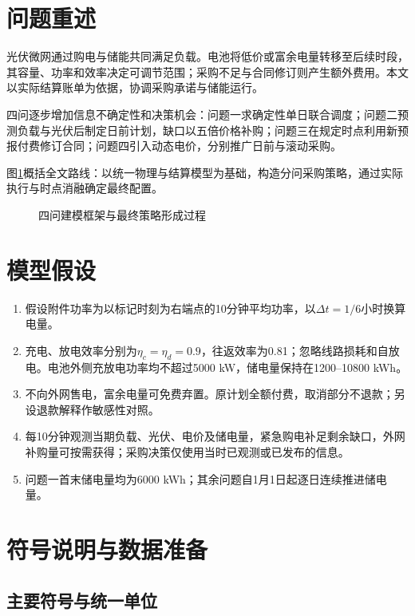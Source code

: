 \section{问题重述}

光伏微网通过购电与储能共同满足负载。电池将低价或富余电量转移至后续时段，其容量、功率和效率决定可调节范围；采购不足与合同修订则产生额外费用。本文以实际结算账单为依据，协调采购承诺与储能运行。

四问逐步增加信息不确定性和决策机会：问题一求确定性单日联合调度；问题二预测负载与光伏后制定日前计划，缺口以五倍价格补购；问题三在规定时点利用新预报付费修订合同；问题四引入动态电价，分别推广日前与滚动采购。

图\ref{fig:modeling-framework}概括全文路线：以统一物理与结算模型为基础，构造分问采购策略，通过实际执行与时点消融确定最终配置。

\begin{figure}[H]\centering

\caption{四问建模框架与最终策略形成过程}
\label{fig:modeling-framework}
\end{figure}

\section{模型假设}

\begin{enumerate}
 \item 假设附件功率为以标记时刻为右端点的10分钟平均功率，以$\Delta t=1/6$小时换算电量。
 \item 充电、放电效率分别为$\eta_c=\eta_d=0.9$，往返效率为0.81；忽略线路损耗和自放电。电池外侧充放电功率均不超过5000 kW，储电量保持在1200--10800 kWh。
 \item 不向外网售电，富余电量可免费弃置。原计划全额付费，取消部分不退款；另设退款解释作敏感性对照。
 \item 每10分钟观测当期负载、光伏、电价及储电量，紧急购电补足剩余缺口，外网补购量可按需获得；采购决策仅使用当时已观测或已发布的信息。
 \item 问题一首末储电量均为6000 kWh；其余问题自1月1日起逐日连续推进储电量。
\end{enumerate}

\section{符号说明与数据准备}

\subsection{主要符号与统一单位}

